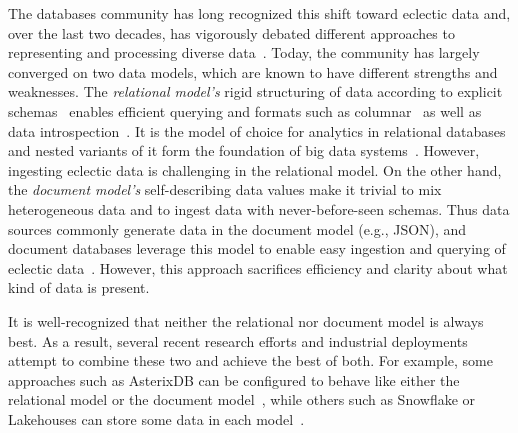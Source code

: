 The databases community has long recognized this shift toward eclectic data and, over the last two decades, has vigorously debated different approaches to representing and processing diverse data~. Today, the community has largely converged on two data models, which are known to have different strengths and weaknesses. The {\em relational model's} rigid structuring of data according to explicit schemas~ enables efficient querying and formats such as columnar~ as well as data introspection~\cite{aurum}.
It is the model of choice for analytics in relational databases and nested variants of it form the foundation of big data systems~\cite{avro, parquet, dremel, spark, delta_lake}. However, ingesting eclectic data is challenging in the relational model. On the other hand, the {\em document model's} self-describing data values make it trivial to mix heterogeneous data and to ingest data with never-before-seen schemas. Thus data sources commonly generate data in the document model (e.g., JSON), and document databases leverage this model to enable easy ingestion and querying of eclectic data~\cite{mongo, couchbase}. However, this approach sacrifices efficiency and clarity about what kind of data is present. 

It is well-recognized that neither the relational nor document model is always best.
As a result, several recent research efforts and industrial deployments attempt to combine these two and achieve the best of both. For example, some approaches such as AsterixDB can be configured to behave like either the relational model or the document model~\cite{asterixdb, sql++}, while others such as Snowflake or Lakehouses can store some data in each model~\cite{snowflake, postgres, bigdawg, dbms+, delta_lake, lakehouse}.

